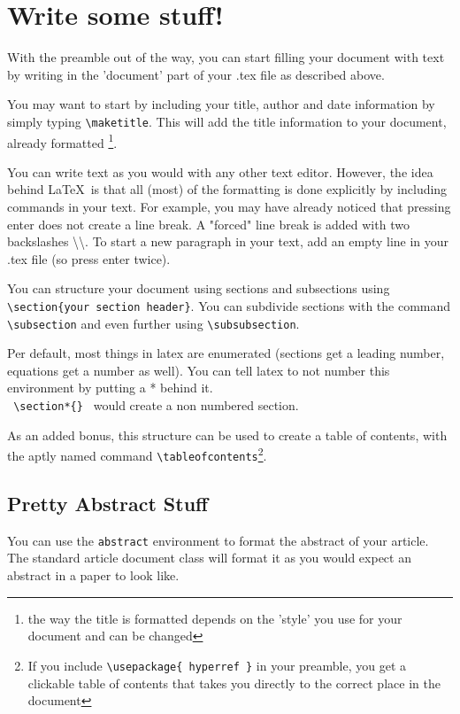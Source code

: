 \section{Write some stuff!}

With the preamble out of the way, you can start filling your document with text by writing in the 'document' part of your .tex file as described above.

You may want to start by including your title, author and date information by simply typing \texttt{\textbackslash maketitle}. This will add the title information to your document, already formatted \footnote{the way the title is formatted depends on the 'style' you use for your document and can be changed}.

You can write text as you would with any other text editor. However, the idea behind \LaTeX~is that all (most) of the formatting is done explicitly by including commands in your text.
For example, you may have already noticed that pressing enter does not create a line break. A "forced" line break is added with two backslashes \textbackslash\textbackslash. To start a new paragraph in your text, add an empty line in your .tex file (so press enter twice).

You can structure your document using sections and subsections using \texttt{\textbackslash section\{your section header\}}. You can subdivide sections with the command \texttt{\textbackslash subsection} and even further using \texttt{\textbackslash subsubsection}.

Per default, most things in latex are enumerated (sections get a leading number, equations get a number as well). You can tell latex to not number this environment by putting a * behind it.\\
\texttt{ \textbackslash section*\{\} } would create a non numbered section.

As an added bonus, this structure can be used to create a table of contents, with the aptly named command \texttt{\textbackslash tableofcontents}\footnote{If you include \texttt{\textbackslash usepackage\{ hyperref \}} in your preamble, you get a clickable table of contents that takes you directly to the correct place in the document}.


\subsection{Pretty Abstract Stuff}

You can use the \texttt{abstract} environment to format the abstract of your article. The standard article document class will format it as you would expect an abstract in a paper to look like.

